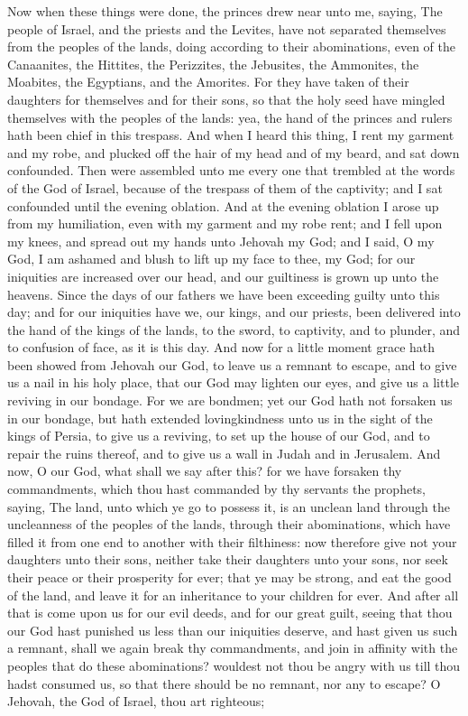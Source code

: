 Now when these things were done, the princes drew near unto me, saying, The people of Israel, and the priests and the Levites, have not separated themselves from the peoples of the lands, doing according to their abominations, even of the Canaanites, the Hittites, the Perizzites, the Jebusites, the Ammonites, the Moabites, the Egyptians, and the Amorites. For they have taken of their daughters for themselves and for their sons, so that the holy seed have mingled themselves with the peoples of the lands: yea, the hand of the princes and rulers hath been chief in this trespass. And when I heard this thing, I rent my garment and my robe, and plucked off the hair of my head and of my beard, and sat down confounded. Then were assembled unto me every one that trembled at the words of the God of Israel, because of the trespass of them of the captivity; and I sat confounded until the evening oblation.  And at the evening oblation I arose up from my humiliation, even with my garment and my robe rent; and I fell upon my knees, and spread out my hands unto Jehovah my God; and I said, O my God, I am ashamed and blush to lift up my face to thee, my God; for our iniquities are increased over our head, and our guiltiness is grown up unto the heavens. Since the days of our fathers we have been exceeding guilty unto this day; and for our iniquities have we, our kings, and our priests, been delivered into the hand of the kings of the lands, to the sword, to captivity, and to plunder, and to confusion of face, as it is this day. And now for a little moment grace hath been showed from Jehovah our God, to leave us a remnant to escape, and to give us a nail in his holy place, that our God may lighten our eyes, and give us a little reviving in our bondage. For we are bondmen; yet our God hath not forsaken us in our bondage, but hath extended lovingkindness unto us in the sight of the kings of Persia, to give us a reviving, to set up the house of our God, and to repair the ruins thereof, and to give us a wall in Judah and in Jerusalem. And now, O our God, what shall we say after this? for we have forsaken thy commandments, which thou hast commanded by thy servants the prophets, saying, The land, unto which ye go to possess it, is an unclean land through the uncleanness of the peoples of the lands, through their abominations, which have filled it from one end to another with their filthiness: now therefore give not your daughters unto their sons, neither take their daughters unto your sons, nor seek their peace or their prosperity for ever; that ye may be strong, and eat the good of the land, and leave it for an inheritance to your children for ever. And after all that is come upon us for our evil deeds, and for our great guilt, seeing that thou our God hast punished us less than our iniquities deserve, and hast given us such a remnant, shall we again break thy commandments, and join in affinity with the peoples that do these abominations? wouldest not thou be angry with us till thou hadst consumed us, so that there should be no remnant, nor any to escape? O Jehovah, the God of Israel, thou art righteous; 